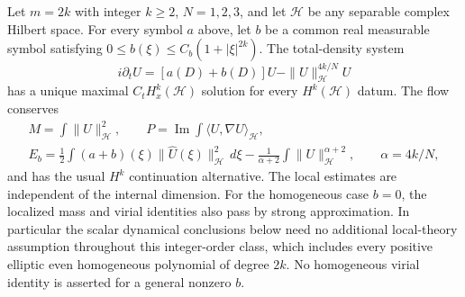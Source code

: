\begin{proposition}
\label{prop:r13g-local-flow}
Let $m=2k$ with integer $k\ge2$, $N=1,2,3$, and let $\mathcal H$
be any separable complex Hilbert space. For every symbol $a$ above,
let $b$ be a common real measurable symbol satisfying
$0\le b(\xi)\le C_b(1+|\xi|^{2k})$. The total-density system
\[
 i\partial_tU=[a(D)+b(D)]U-\|U\|_{\mathcal H}^{4k/N}U
\]
has a unique maximal $C_tH^k_x(\mathcal H)$ solution for every
$H^k(\mathcal H)$ datum. The flow conserves
\begin{gather*}
 M=\int\|U\|_{\mathcal H}^2,\qquad
 P=\operatorname{Im}\int\langle U,\nabla U\rangle_{\mathcal H},\\
 E_b=\frac12\int(a+b)(\xi)\|\widehat U(\xi)\|_{\mathcal H}^2\,d\xi
       -\frac1{\alpha+2}\int\|U\|_{\mathcal H}^{\alpha+2},
 \qquad\alpha=4k/N,
\end{gather*}
and has the usual $H^k$ continuation alternative. The local estimates
are independent of the internal dimension. For the homogeneous case
$b=0$, the localized mass and virial identities also pass by strong
approximation. In particular the scalar dynamical conclusions below
need no additional local-theory assumption throughout this integer-order
class, which includes every positive elliptic even homogeneous
polynomial of degree $2k$. No homogeneous virial identity is asserted
for a general nonzero $b$.
\end{proposition}
